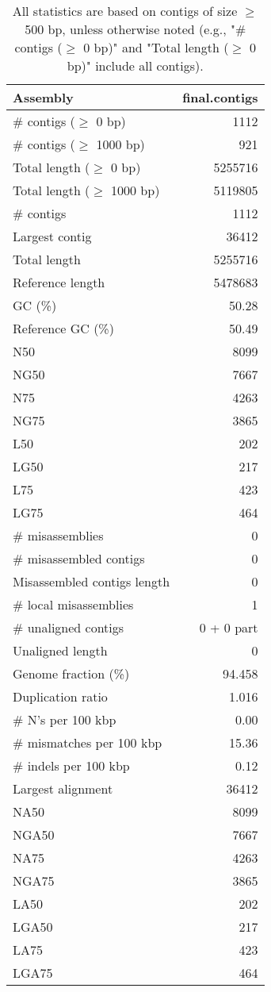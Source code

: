 \documentclass[12pt,a4paper]{article}
\begin{document}
\begin{table}[ht]
\begin{center}
\caption{All statistics are based on contigs of size $\geq$ 500 bp, unless otherwise noted (e.g., "\# contigs ($\geq$ 0 bp)" and "Total length ($\geq$ 0 bp)" include all contigs).}
\begin{tabular}{|l*{1}{|r}|}
\hline
Assembly & final.contigs \\ \hline
\# contigs ($\geq$ 0 bp) & 1112 \\ \hline
\# contigs ($\geq$ 1000 bp) & 921 \\ \hline
Total length ($\geq$ 0 bp) & 5255716 \\ \hline
Total length ($\geq$ 1000 bp) & 5119805 \\ \hline
\# contigs & 1112 \\ \hline
Largest contig & 36412 \\ \hline
Total length & 5255716 \\ \hline
Reference length & 5478683 \\ \hline
GC (\%) & 50.28 \\ \hline
Reference GC (\%) & 50.49 \\ \hline
N50 & 8099 \\ \hline
NG50 & 7667 \\ \hline
N75 & 4263 \\ \hline
NG75 & 3865 \\ \hline
L50 & 202 \\ \hline
LG50 & 217 \\ \hline
L75 & 423 \\ \hline
LG75 & 464 \\ \hline
\# misassemblies & 0 \\ \hline
\# misassembled contigs & 0 \\ \hline
Misassembled contigs length & 0 \\ \hline
\# local misassemblies & 1 \\ \hline
\# unaligned contigs & 0 + 0 part \\ \hline
Unaligned length & 0 \\ \hline
Genome fraction (\%) & 94.458 \\ \hline
Duplication ratio & 1.016 \\ \hline
\# N's per 100 kbp & 0.00 \\ \hline
\# mismatches per 100 kbp & 15.36 \\ \hline
\# indels per 100 kbp & 0.12 \\ \hline
Largest alignment & 36412 \\ \hline
NA50 & 8099 \\ \hline
NGA50 & 7667 \\ \hline
NA75 & 4263 \\ \hline
NGA75 & 3865 \\ \hline
LA50 & 202 \\ \hline
LGA50 & 217 \\ \hline
LA75 & 423 \\ \hline
LGA75 & 464 \\ \hline
\end{tabular}
\end{center}
\end{table}
\end{document}
